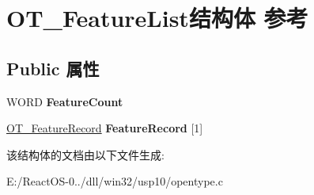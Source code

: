 \hypertarget{struct_o_t___feature_list}{}\section{O\+T\+\_\+\+Feature\+List结构体 参考}
\label{struct_o_t___feature_list}
\subsection*{Public 属性}
\begin{DoxyCompactItemize}
\item 
\mbox{\label{struct_o_t___feature_list_a4faee37fd18a9060f4a0efeadcb59774}} 
W\+O\+RD {\bfseries Feature\+Count}
\item 
\mbox{\label{struct_o_t___feature_list_a939e00b5aae5bd68a3803c48eee049a3}} 
\hyperlink{struct_o_t___feature_record}{O\+T\+\_\+\+Feature\+Record} {\bfseries Feature\+Record} \mbox{[}1\mbox{]}
\end{DoxyCompactItemize}


该结构体的文档由以下文件生成\+:\begin{DoxyCompactItemize}
\item 
E\+:/\+React\+O\+S-\/0../dll/win32/usp10/opentype.\+c\end{DoxyCompactItemize}

